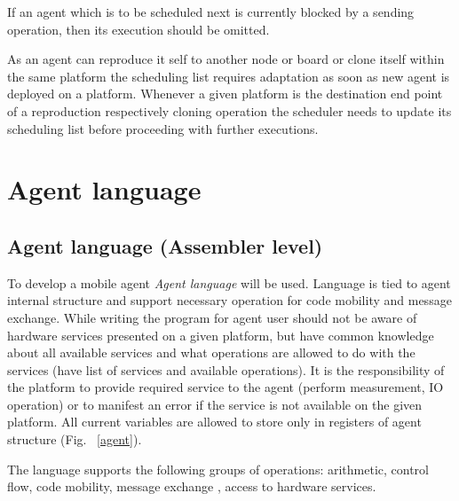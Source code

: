 \documentclass{scrreprt}
\begin{document}
\noindent
If an agent which is to be scheduled next is currently blocked by a sending operation, then its execution should be omitted. 


\noindent
As an agent can reproduce it self to another node or board or clone itself within the same platform the scheduling 
list requires adaptation as soon as new agent is deployed on a platform. Whenever a given platform is the destination 
end point of a reproduction respectively cloning operation the scheduler needs to update its scheduling list before proceeding with further executions.

\section{Agent language}

\subsection{Agent language (Assembler level)}
\noindent
To develop a mobile agent \textit{Agent language} will be used. Language is tied to agent internal structure and support necessary operation for code mobility and message exchange. While writing the program for agent user should not be aware of hardware services presented on a given platform, but have common knowledge about all available services and what operations are allowed to do with the services (have list of services and available operations). It is the responsibility of the platform to provide required service to the agent (perform measurement, IO operation) or to manifest an error if the service is not available on the given platform. All current variables are allowed to store only in registers of agent structure (Fig. ~\ref{agent}).


\noindent
The language supports the following groups of operations: arithmetic, control flow, code mobility, message exchange , access to hardware services.
\end{document}
